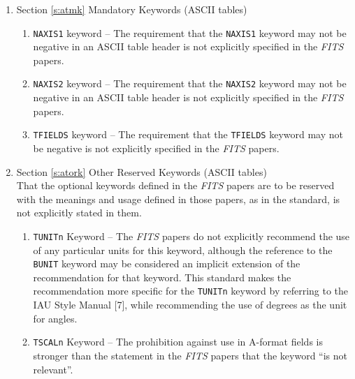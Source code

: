 \begin{enumerate}
\item Section \ref{s:atmk} Mandatory Keywords (ASCII tables)

 \begin{enumerate}

 \item {\tt NAXIS1} keyword -- The requirement
that 
     the {\tt NAXIS1} keyword may not be negative in an ASCII table header
     is not explicitly specified in
     the {\em FITS\/} papers.  

 \item {\tt NAXIS2} keyword -- The requirement that 
     the {\tt NAXIS2} keyword 
     may not be negative in an ASCII table header
     is not explicitly specified in
     the {\em FITS\/} papers.  

 \item {\tt TFIELDS} keyword -- The requirement that 
     the {\tt TFIELDS} keyword 
     may not be negative is not explicitly specified 
     in the {\em FITS\/} papers.  

\end{enumerate}

\item Section \ref{s:atork} Other Reserved Keywords (ASCII tables)\\
     That the optional keywords 
     defined in the {\em FITS\/} papers are 
     to be reserved with the meanings and usage defined in those papers, 
     as in the standard, is not explicitly stated in them.

 \begin {enumerate} 

 \item {\tt TUNITn} Keyword -- The {\em FITS\/} papers 
     do not explicitly recommend the use of any particular 
     units
     for this keyword, although the reference to the {\tt BUNIT} 
     keyword may be considered an implicit extension of
     the recommendation for that keyword. This standard makes 
     the recommendation more specific for the 
     {\tt TUNITn} keyword by referring to the 
     IAU Style Manual [7], while recommending the use of 
      degrees as the unit for angles.

 \item {\tt TSCALn} Keyword  -- The prohibition against use in 
     A-format fields is stronger than
     the statement in the {\em FITS\/} papers that the
     keyword
     ``is not relevant''.


\end{enumerate}
\end{enumerate}
